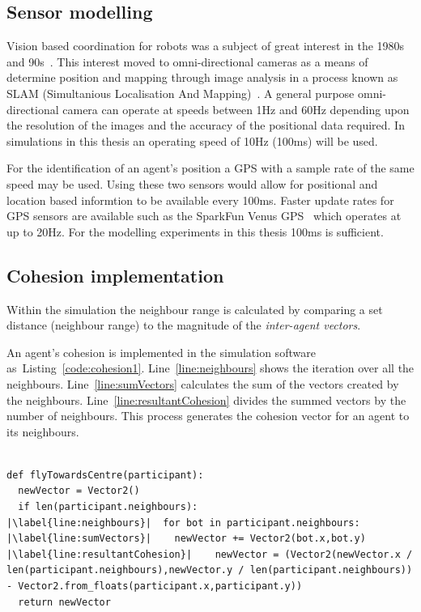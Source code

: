 \subsection{Sensor modelling}
Vision based coordination for robots was a subject of great interest in the 1980s and 90s~\cite{DK:02}. This interest moved to omni-directional cameras as a means of determine position and mapping through image analysis in a process known as SLAM (Simultanious Localisation And Mapping)~\cite{TRI:15,SG:15}. A general purpose omni-directional camera can operate at speeds between 1Hz and 60Hz depending upon the resolution of the images and the accuracy of the positional data required. In simulations in this thesis an operating speed of 10Hz (100ms) will be used. 

For the identification of an agent's position a GPS with a sample rate of the same speed may be used. Using these two sensors would allow for positional and location based informtion to be available every 100ms. Faster update rates for GPS sensors are available such as the SparkFun Venus GPS~\cite{SF:16} which operates at up to 20Hz. For the modelling experiments in this thesis 100ms is sufficient.

\subsection{Cohesion implementation}
Within the simulation the neighbour range is calculated by comparing a set distance (neighbour range) to the magnitude of the \textit{inter-agent vectors}.

An agent's cohesion is implemented in the simulation software as~Listing~\ref{code:cohesion1}. Line~\ref{line:neighbours} shows the iteration over all the neighbours. Line~\ref{line:sumVectors} calculates the sum of the vectors created by the neighbours. Line~\ref{line:resultantCohesion} divides the summed vectors by the number of neighbours. This process generates the cohesion vector for an agent to its neighbours.

\lstset{language=Python,
basicstyle=\tiny,
numbers=left, 
numberstyle=\tiny,
captionpos=b,
frame=single,
breaklines=true,
caption=Cohesion code,
escapechar=|
} %
\begin{lstlisting}[label={code:cohesion1}]  % Start your code-block

def flyTowardsCentre(participant):
  newVector = Vector2()
  if len(participant.neighbours):
|\label{line:neighbours}|  for bot in participant.neighbours:
|\label{line:sumVectors}|    newVector += Vector2(bot.x,bot.y)
|\label{line:resultantCohesion}|    newVector = (Vector2(newVector.x / len(participant.neighbours),newVector.y / len(participant.neighbours)) - Vector2.from_floats(participant.x,participant.y))
  return newVector
\end{lstlisting}


